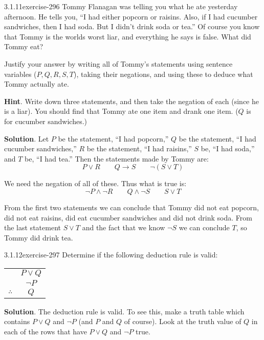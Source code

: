 \documentclass[twoside,11pt,]{book}
\numberwithin{equation}{chapter}
\newcommand{\hrulethin}  {\noalign{\hrule height 0.04em}}
\newcommand{\imp}{\rightarrow}
\begin{document}
\begin{divisionsolution}{3.1.11}{}{exercise-296}%
\hypertarget{p-3977}{}%
Tommy Flanagan was telling you what he ate yesterday afternoon. He tells you, ``I had either popcorn or raisins. Also, if I had cucumber sandwiches, then I had soda. But I didn't drink soda or tea.'' Of course you know that Tommy is the worlds worst liar, and everything he says is false. What did Tommy eat?%
\par
\hypertarget{p-3978}{}%
Justify your answer by writing all of Tommy's statements using sentence variables (\(P, Q, R, S, T\)), taking their negations, and using these to deduce what Tommy actually ate.%
\par\smallskip%
\noindent\textbf{Hint}.\quad%
\hypertarget{p-3979}{}%
Write down three statements, and then take the negation of each (since he is a liar).  You should find that Tommy ate one item and drank one item.  (\(Q\) is for cucumber sandwiches.)%
\par\smallskip%
\noindent\textbf{Solution}.\quad%
\hypertarget{p-3980}{}%
Let \(P\) be the statement, ``I had popcorn,'' \(Q\) be the statement, ``I had cucumber sandwiches,'' \(R\) be the statement, ``I had raisins,'' \(S\) be, ``I had soda,'' and \(T\) be, ``I had tea.'' Then the statements made by Tommy are:%
\begin{equation*}
P \vee R \qquad Q \imp S \qquad \neg(S \vee T)
\end{equation*}
%
\par
\hypertarget{p-3981}{}%
We need the negation of all of these. Thus what is true is:%
\begin{equation*}
\neg P \wedge \neg R \qquad Q \wedge \neg S \qquad S \vee T
\end{equation*}
%
\par
\hypertarget{p-3982}{}%
From the first two statements we can conclude that Tommy did not eat popcorn, did not eat raisins, did eat cucumber sandwiches and did not drink soda. From the last statement \(S \vee T\) and the fact that we know \(\neg S\) we can conclude \(T\), so Tommy did drink tea.%
\end{divisionsolution}%
\begin{divisionsolution}{3.1.12}{}{exercise-297}%
\hypertarget{p-3983}{}%
Determine if the following deduction rule is valid:%
\begin{sidebyside}{1}{0}{0}{0}%
\begin{sbspanel}{1}%
{\centering%
\begin{tabular}{cc}
&\(P \vee Q\)\tabularnewline[0pt]
&\(\neg P\)\tabularnewline\hrulethin
\(\therefore\)&\(Q\)
\end{tabular}
\par}
\end{sbspanel}%
\end{sidebyside}%
\par\smallskip%
\noindent\textbf{Solution}.\quad%
\hypertarget{p-3984}{}%
The deduction rule is valid. To see this, make a truth table which contains \(P \vee Q\) and \(\neg P\) (and \(P\) and \(Q\) of course). Look at the truth value of \(Q\) in each of the rows that have \(P \vee Q\) and \(\neg P\) true.%
\end{divisionsolution}%
\end{document}

